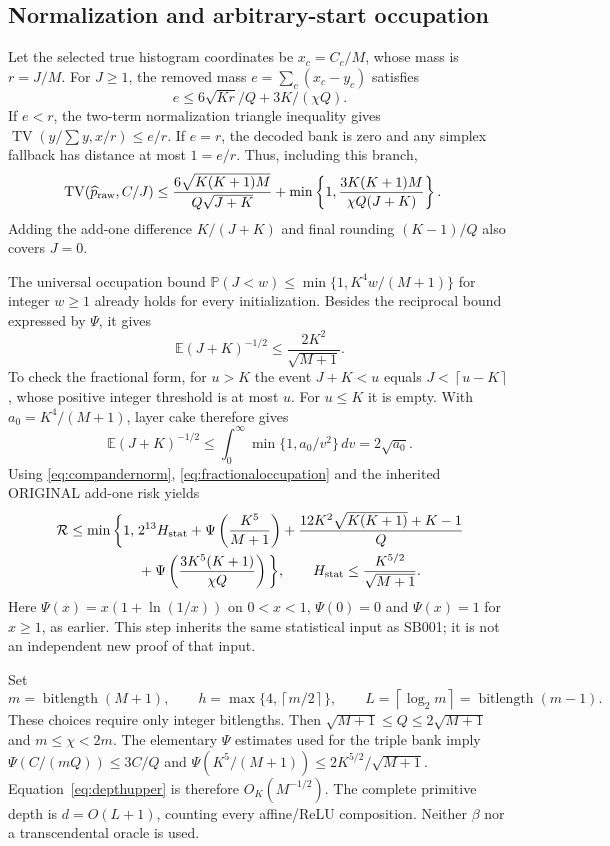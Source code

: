 \documentclass[11pt,letterpaper]{article}
\theoremstyle{definition}\newtheorem{definition}[theorem]{Definition}
\theoremstyle{remark}\newtheorem{remark}[theorem]{Remark}
\newcommand{\TV}{\operatorname{TV}}
\newcommand{\E}{\mathbb{E}}
\newcommand{\Prob}{\mathbb{P}}
\newcommand{\ceil}[1]{\left\lceil #1\right\rceil}
\newcommand{\Risk}{\mathcal{R}}
\newcommand{\bl}{\operatorname{bitlength}}
\begin{document}
\subsection{Normalization and arbitrary-start occupation}
Let the selected true histogram coordinates be $x_c=C_c/M$, whose mass is $r=J/M$. For $J\ge1$, the removed mass $e=\sum_c(x_c-y_c)$ satisfies
\[
 e\le6\sqrt{Kr}/Q+3K/(\chi Q).
\]
If $e<r$, the two-term normalization triangle inequality gives
$\TV(y/\sum y,x/r)\le e/r$. If $e=r$, the decoded bank is zero and any simplex fallback has distance at most $1=e/r$. Thus, including this branch,
\begin{align}\label{eq:compandernorm}
 \TV(\widehat p_{\rm raw},C/J)
 &\le\frac{6\sqrt{K(K+1)M}}{Q\sqrt{J+K}}
   +\min\left\{1,\frac{3K(K+1)M}{\chi Q(J+K)}\right\}.
\end{align}
Adding the add-one difference $K/(J+K)$ and final rounding $(K-1)/Q$ also covers $J=0$.

The universal occupation bound
$\Prob(J<w)\le\min\{1,K^4w/(M+1)\}$ for integer $w\ge1$
already holds for every initialization. Besides the reciprocal bound expressed by $\Psi$, it gives
\begin{equation}\label{eq:fractionaloccupation}
 \E(J+K)^{-1/2}\le\frac{2K^2}{\sqrt{M+1}}.
\end{equation}
To check the fractional form, for $u>K$ the event $J+K<u$ equals
$J<\ceil{u-K}$, whose positive integer threshold is at most $u$.
For $u\le K$ it is empty. With $a_0=K^4/(M+1)$, layer cake therefore gives
\[
 \E(J+K)^{-1/2}
 \le\int_0^\infty\min\{1,a_0/v^2\}\,dv=2\sqrt{a_0}.
\]
Using \eqref{eq:compandernorm}, \eqref{eq:fractionaloccupation} and the inherited ORIGINAL add-one risk yields
\begin{equation}\label{eq:depthupper}
 \begin{split}
 \Risk\le\min\bigg\{1,\;&2^{13}H_{\rm stat}
 +\Psi\left(\frac{K^5}{M+1}\right)
 +\frac{12K^2\sqrt{K(K+1)}+K-1}{Q}\\
 &+\Psi\left(\frac{3K^5(K+1)}{\chi Q}\right)\bigg\},
 \qquad H_{\rm stat}\le\frac{K^{5/2}}{\sqrt{M+1}}.
 \end{split}
\end{equation}
Here $\Psi(x)=x(1+\ln(1/x))$ on $0<x<1$, $\Psi(0)=0$ and $\Psi(x)=1$ for $x\ge1$, as earlier. This step inherits the same statistical input as SB001; it is not an independent new proof of that input.

Set
\[
 m=\bl(M+1),\qquad h=\max\{4,\ceil{m/2}\},\qquad
 L=\ceil{\log_2m}=\bl(m-1).
\]
These choices require only integer bitlengths. Then
$\sqrt{M+1}\le Q\le2\sqrt{M+1}$ and $m\le\chi<2m$.
The elementary $\Psi$ estimates used for the triple bank imply
$\Psi(C/(mQ))\le3C/Q$ and
$\Psi(K^5/(M+1))\le2K^{5/2}/\sqrt{M+1}$.
Equation~\eqref{eq:depthupper} is therefore $O_K(M^{-1/2})$.
The complete primitive depth is $d=O(L+1)$, counting every affine/ReLU composition. Neither $\beta$ nor a transcendental oracle is used.
\end{document}
